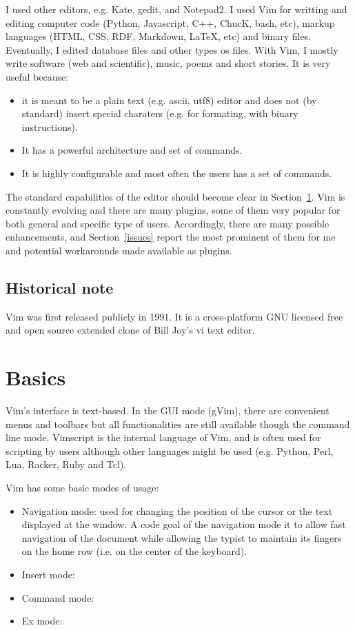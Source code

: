 \documentclass{article}
\begin{document}
I used other editors, e.g. Kate, gedit, and Notepad2.
I used Vim for writting and editing computer code (Python, Javascript, C++, ChucK, bash, etc), markup languages (HTML, CSS, RDF, Markdown, \LaTeX, etc) and binary files.
Eventually, I edited database files and other types os files.
With Vim, I mostly write software (web and scientific),
music, poems and short stories.
It is very useful because:
\begin{itemize}
  \item it is meant to be a plain text (e.g. ascii, utf8) editor
  and does not (by standard) insert special charaters (e.g. for formating, with binary instructions).
  \item It has a powerful architecture and set of commands.
  \item It is highly configurable and most often the users
  has a set of commands.
\end{itemize}

The standard capabilities of the editor
should become clear in Section~\ref{basics}.
Vim is constantly evolving and there are many plugins,
some of them very popular for both general and specific
type of users.
Accordingly, there are many possible enhancements,
and Section~\ref{issues} report the most prominent of them
for me and potential workarounds made available as plugins.

\subsection{Historical note}
Vim was first released publicly in 1991.
It is a cross-platform GNU licensed free and open source extended clone of Bill Joy's vi text editor.



\section{Basics}\label{basics}
Vim's interface is text-based.
In the GUI mode (gVim),
there are convenient menus and toolbars
but all functionalities are still available though
the command line mode.
Vimscript is the internal language of Vim,
and is often used for scripting by users
although other languages might be used 
(e.g. Python, Perl, Lua, Racker, Ruby and Tcl). 

Vim has some basic modes of usage:
\begin{itemize}
  \item Navigation mode: used for changing
  the position of the cursor or the text displayed
  at the window.
  A code goal of the navigation mode it to allow fast
  navigation of the document while allowing
  the typist to maintain its fingers on the home row
  (i.e. on the center of the keyboard).
  \item Insert mode:
  \item Command mode:
  \item Ex mode:
\end{itemize}
\end{document}
